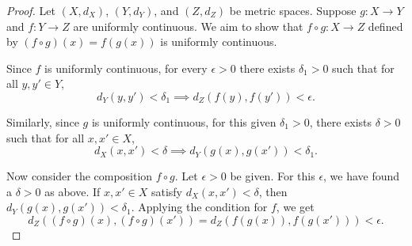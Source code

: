 \documentclass[11pt]{article}
\begin{document}
\begin{exercise}{12}
    \begin{proof}
        Let $(X, d_X)$, $(Y, d_Y)$, and $(Z, d_Z)$ be metric spaces. Suppose $g: X \to Y$ and $f: Y \to Z$ are uniformly continuous. We aim to show that $f \circ g: X \to Z$ defined by $(f \circ g)(x) = f(g(x))$ is uniformly continuous.

Since $f$ is uniformly continuous, for every $\epsilon > 0$ there exists $\delta_1 > 0$ such that for all $y, y' \in Y$,
\[
d_Y(y, y') < \delta_1 \implies d_Z(f(y), f(y')) < \epsilon.
\]

Similarly, since $g$ is uniformly continuous, for this given $\delta_1 > 0$, there exists $\delta > 0$ such that for all $x, x' \in X$,
\[
d_X(x, x') < \delta \implies d_Y(g(x), g(x')) < \delta_1.
\]

Now consider the composition $f \circ g$. Let $\epsilon > 0$ be given. For this $\epsilon$, we have found a $\delta > 0$ as above. If $x, x' \in X$ satisfy $d_X(x, x') < \delta$, then $d_Y(g(x), g(x')) < \delta_1$. Applying the condition for $f$, we get
\[
d_Z((f \circ g)(x), (f \circ g)(x')) = d_Z(f(g(x)), f(g(x'))) < \epsilon.
\]
    \end{proof}
\end{exercise}
\end{document}
